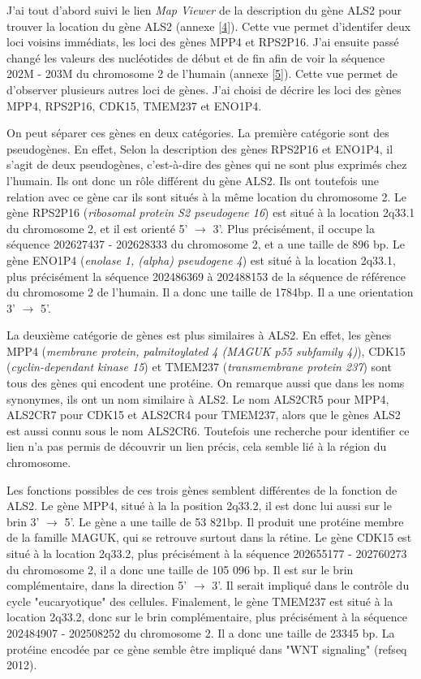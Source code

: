 \documentclass[10.8pt]{article} %
\begin{document}
J'ai tout d'abord suivi le lien \emph{Map Viewer} de la description du gène ALS2 pour trouver la location 
du gène ALS2 (annexe \ref{4}).  Cette vue permet d'identifer deux loci voisins immédiats, les loci des gènes 
MPP4 et RPS2P16. J'ai ensuite passé changé les valeurs des nucléotides de début et de fin afin de voir la
séquence 202M - 203M du chromosome 2 de l'humain (annexe \ref{5}). Cette vue permet de d'observer plusieurs autres
loci de gènes. J'ai choisi de décrire les loci des gènes MPP4, RPS2P16, CDK15, TMEM237 et ENO1P4.

On peut séparer ces gènes en deux catégories. La première catégorie sont des pseudogènes. En effet,
Selon la description des gènes RPS2P16 et ENO1P4, il s'agit de deux pseudogènes, c'est-à-dire des
gènes qui ne sont plus exprimés chez l'humain. Ils ont donc un rôle différent du gène ALS2. Ils ont toutefois
une relation avec ce gène car ils sont situés à la même location du chromosome 2. Le gène RPS2P16 
(\emph{ribosomal protein S2 pseudogene 16}) est situé à la location 2q33.1 du chromosome 2, et il 
est orienté 5' $\rightarrow$ 3'. Plus précisément, il occupe la séquence 202627437 - 202628333 du 
chromosome 2, et a une taille de 896 bp. Le gène ENO1P4 (\emph{enolase 1, (alpha) pseudogene 4})
est situé  à la location 2q33.1, plus précisément la séquence 202486369 à 202488153 de la séquence de référence
du chromosome 2 de l'humain. Il a donc une taille de 1784bp. Il a une orientation 3' $\rightarrow$ 5'. 

La deuxième catégorie de gènes est plus similaires à ALS2. En effet, les gènes MPP4 
(\emph{membrane protein, palmitoylated 4 (MAGUK p55 subfamily 4)}), CDK15 (\emph{cyclin-dependant kinase 15}) et
TMEM237 (\emph{transmembrane protein 237}) sont tous des gènes qui encodent une protéine. On remarque
aussi que dans les noms synonymes, ils ont un nom similaire à ALS2. Le nom ALS2CR5 pour MPP4, ALS2CR7 pour CDK15 et
ALS2CR4 pour TMEM237, alors que le gènes ALS2 est aussi connu sous le nom ALS2CR6. Toutefois une recherche pour
identifier ce lien n'a pas permis de découvrir un lien précis, cela semble lié à la région du chromosome.

Les fonctions possibles de ces trois gènes semblent différentes de la fonction de ALS2. Le gène MPP4, situé à la
la position 2q33.2, il est donc lui aussi sur le brin 3' $\rightarrow$ 5'. Le gène a une taille de 53 821bp. Il 
produit une protéine membre de la famille MAGUK, qui se retrouve surtout dans la rétine. Le gène CDK15 est situé
à la location 2q33.2, plus précisément à la séquence 202655177 - 202760273 du chromosome 2, il a donc une taille 
de 105 096 bp. Il est sur le brin complémentaire, dans la direction 5' $\rightarrow$ 3'. Il serait impliqué 
dans le contrôle du cycle "eucaryotique" des cellules. Finalement, le gène TMEM237 est situé à la location 2q33.2,
donc sur le brin complémentaire, plus précisément à la séquence 202484907 - 202508252 du chromosome 2. Il a donc
une taille de 23345 bp. La protéine encodée par ce gène semble être impliqué dans "WNT signaling" (refseq 2012). 
\end{document}
